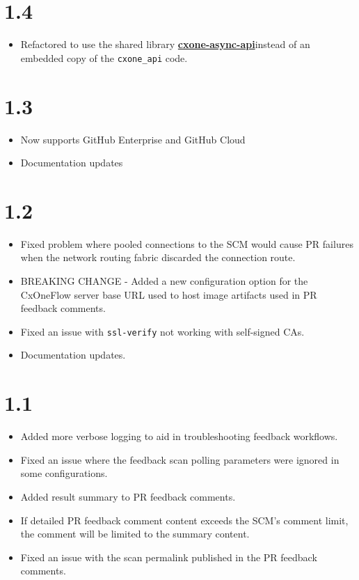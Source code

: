 \section{1.4}

\begin{itemize}
    \item Refactored to use the shared library \href{https://github.com/checkmarx-ts/cxone-async-api}{\textbf{cxone-async-api}}\space instead
    of an embedded copy of the \texttt{cxone\_api} code.
\end{itemize}


\section{1.3}

\begin{itemize}
    \item Now supports GitHub Enterprise and GitHub Cloud
    \item Documentation updates
\end{itemize}

\section{1.2}

\begin{itemize}
    \item Fixed problem where pooled connections to the SCM would cause PR failures when the network routing 
    fabric discarded the connection route.
    \item BREAKING CHANGE - Added a new configuration option for the CxOneFlow server base URL used to host image
    artifacts used in PR feedback comments.
    \item Fixed an issue with \texttt{ssl-verify} not working with self-signed CAs.
    \item Documentation updates.
\end{itemize}


\section{1.1}

\begin{itemize}
    \item Added more verbose logging to aid in troubleshooting feedback workflows.
    \item Fixed an issue where the feedback scan polling parameters were ignored in some configurations.
    \item Added result summary to PR feedback comments.
    \item If detailed PR feedback comment content exceeds the SCM's comment limit, the comment will be limited to the summary content.
    \item Fixed an issue with the scan permalink published in the PR feedback comments.
\end{itemize}


